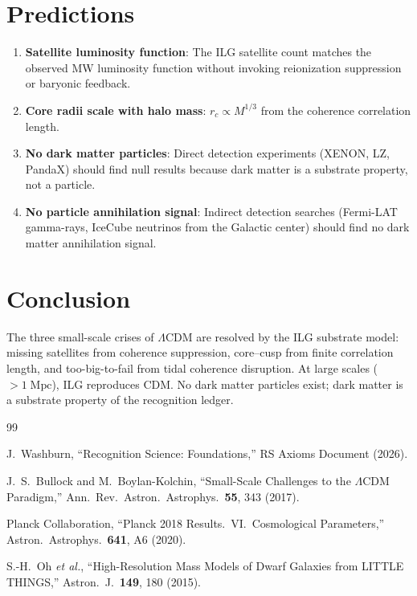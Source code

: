 \documentclass[12pt,a4paper]{article}
\theoremstyle{definition}
\theoremstyle{remark}
\begin{document}
\section{Predictions}
\label{sec:predictions}

\begin{enumerate}
  \item \textbf{Satellite luminosity function}: The ILG satellite
  count matches the observed MW luminosity function without invoking
  reionization suppression or baryonic feedback.

  \item \textbf{Core radii scale with halo mass}: $r_c \propto
  M^{1/3}$ from the coherence correlation length.

  \item \textbf{No dark matter particles}: Direct detection
  experiments (XENON, LZ, PandaX) should find null results
  because dark matter is a substrate property, not a particle.

  \item \textbf{No particle annihilation signal}: Indirect detection
  searches (Fermi-LAT gamma-rays, IceCube neutrinos from the
  Galactic center) should find no dark matter annihilation signal.
\end{enumerate}

\section{Conclusion}
\label{sec:conclusion}

The three small-scale crises of $\Lambda$CDM are resolved by the
ILG substrate model: missing satellites from coherence suppression,
core--cusp from finite correlation length, and too-big-to-fail
from tidal coherence disruption.  At large scales ($> 1\;\mathrm{Mpc}$),
ILG reproduces CDM.  No dark matter particles exist; dark matter
is a substrate property of the recognition ledger.

\begin{thebibliography}{99}

J.~Washburn, ``Recognition Science: Foundations,''
RS Axioms Document (2026).

J.~S.~Bullock and M.~Boylan-Kolchin, ``Small-Scale Challenges to
the $\Lambda$CDM Paradigm,'' Ann.\ Rev.\ Astron.\ Astrophys.\
\textbf{55}, 343 (2017).

Planck Collaboration, ``Planck 2018 Results.\ VI.\ Cosmological
Parameters,'' Astron.\ Astrophys.\ \textbf{641}, A6 (2020).

S.-H.~Oh \textit{et al.}, ``High-Resolution Mass Models of Dwarf
Galaxies from LITTLE THINGS,'' Astron.\ J.\ \textbf{149}, 180
(2015).

\end{thebibliography}
\end{document}
